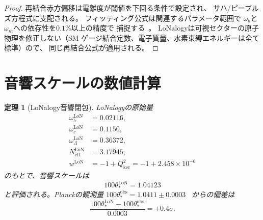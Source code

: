 \documentclass[12pt]{article}
\theoremstyle{plain}
\newtheorem{theorem}{定理}[section]
\theoremstyle{definition}
\numberwithin{equation}{section}
\newcommand{\kker}{\mathrm{ker}}
\newcommand{\eff}{\mathrm{eff}}
\newcommand{\obs}{\mathrm{obs}}
\newcommand{\LoN}{\mathrm{LoN}}
\begin{document}
\begin{proof}
再結合赤方偏移は電離度が閾値を下回る条件で設定され、
サハ/ピーブルズ方程式に支配される。
フィッティング公式は関連するパラメータ範囲で
$\omega_b$と$\omega_m$への依存性を$0.1\%$以上の精度で
捕捉する~\cite{HuSugiyama1996}。
LoNalogyは可視セクターの原子物理を修正しない（SM
ゲージ結合定数、電子質量、水素束縛エネルギーは全て標準）ので、
同じ再結合公式が適用される。
\end{proof}


\section{音響スケールの数値計算}\label{sec:numerical}

\begin{theorem}[LoNalogy音響閉包]\label{thm:thetastar}
LoNalogyの原始量
\begin{align}
\omega_b^{\LoN} &= 0.02116,\\
\omega_c^{\LoN} &= 0.1150,\\
\omega_\Lambda^{\LoN} &= 0.36372,\\
N_{\eff}^{\LoN} &= 3.17945,\\
w^{\LoN} &= -1+Q_{\kker}^2 = -1+2.458\times10^{-6}
\end{align}
のもとで、音響スケールは
\begin{equation}
\boxed{100\theta_*^{\LoN} = 1.04123}
\end{equation}
と評価される。Planckの観測量
$100\theta_*^{\obs}=1.0411\pm0.0003$~\cite{Planck2018}
からの偏差は
\begin{equation}
\frac{100\theta_*^{\LoN}-100\theta_*^{\obs}}{0.0003} = +0.4\sigma.
\end{equation}
\end{theorem}
\end{document}
